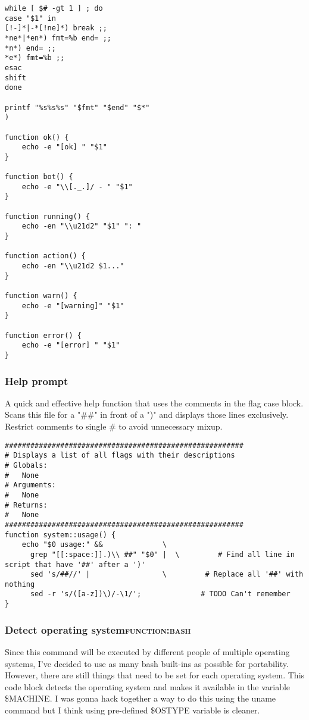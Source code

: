 \documentclass[11pt]{article}
\begin{document}
\begin{verbatim}
while [ $# -gt 1 ] ; do
case "$1" in
[!-]*|-*[!ne]*) break ;;
*ne*|*en*) fmt=%b end= ;;
*n*) end= ;;
*e*) fmt=%b ;;
esac
shift
done

printf "%s%s%s" "$fmt" "$end" "$*"
)

function ok() {
    echo -e "[ok] " "$1"
}

function bot() {
    echo -e "\\[._.]/ - " "$1"
}

function running() {
    echo -en "\\u21d2" "$1" ": "
}

function action() {
    echo -en "\\u21d2 $1..."
}

function warn() {
    echo -e "[warning]" "$1"
}

function error() {
    echo -e "[error] " "$1"
}
\end{verbatim}

\subsubsection{Help prompt}
\label{sec:org76df6c4}
A quick and effective help function that uses the comments in the flag case block. Scans this file for a "\#\#" in front of a ")" and displays those lines exclusively.
Restrict comments to single \# to avoid unnecessary mixup.

\begin{verbatim}
########################################################
# Displays a list of all flags with their descriptions
# Globals:
#   None
# Arguments:
#   None
# Returns:
#   None
########################################################
function system::usage() {
    echo "$0 usage:" &&              \
      grep "[[:space:]].)\\ ##" "$0" |  \         # Find all line in script that have '##' after a ')'
      sed 's/##//' |                 \         # Replace all '##' with nothing
      sed -r 's/([a-z])\)/-\1/';              # TODO Can't remember
}
\end{verbatim}
\subsubsection{Detect operating system\hfill{}\textsc{function:bash}}
\label{sec:org97803f6}
Since this command will be executed by different people of multiple operating systems, I've decided to use as many bash built-ins as possible for portability. However, there are still things that need to be set for each operating system. This code block detects the operating system and makes it available in the variable \$MACHINE. I was gonna hack together a way to do this using the uname command but I think using pre-defined \$OSTYPE variable is cleaner.
\end{document}

